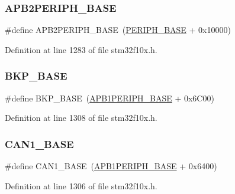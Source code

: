 \subsubsection{\texorpdfstring{A\+P\+B2\+P\+E\+R\+I\+P\+H\+\_\+\+B\+A\+SE}{APB2PERIPH\_BASE}}
{\footnotesize\ttfamily \#define A\+P\+B2\+P\+E\+R\+I\+P\+H\+\_\+\+B\+A\+SE~(\hyperlink{group___peripheral__memory__map_ga9171f49478fa86d932f89e78e73b88b0}{P\+E\+R\+I\+P\+H\+\_\+\+B\+A\+SE} + 0x10000)}



Definition at line 1283 of file stm32f10x.\+h.

\mbox{\label{group___peripheral__memory__map_gaa15d5a9f40794105397ba5ea567c4ae1}} 
\subsubsection{\texorpdfstring{B\+K\+P\+\_\+\+B\+A\+SE}{BKP\_BASE}}
{\footnotesize\ttfamily \#define B\+K\+P\+\_\+\+B\+A\+SE~(\hyperlink{group___peripheral__memory__map_ga45666d911f39addd4c8c0a0ac3388cfb}{A\+P\+B1\+P\+E\+R\+I\+P\+H\+\_\+\+B\+A\+SE} + 0x6\+C00)}



Definition at line 1308 of file stm32f10x.\+h.

\mbox{\label{group___peripheral__memory__map_gad8e45ea6c032d9fce1b0516fff9d8eaa}} 
\subsubsection{\texorpdfstring{C\+A\+N1\+\_\+\+B\+A\+SE}{CAN1\_BASE}}
{\footnotesize\ttfamily \#define C\+A\+N1\+\_\+\+B\+A\+SE~(\hyperlink{group___peripheral__memory__map_ga45666d911f39addd4c8c0a0ac3388cfb}{A\+P\+B1\+P\+E\+R\+I\+P\+H\+\_\+\+B\+A\+SE} + 0x6400)}



Definition at line 1306 of file stm32f10x.\+h.

